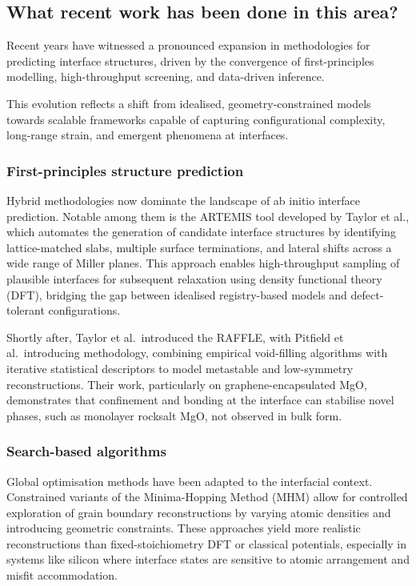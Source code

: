 \subsection{What recent work has been done in this area?}

Recent years have witnessed a pronounced expansion in methodologies for predicting interface structures, driven by the convergence of first-principles modelling, high-throughput screening, and data-driven inference.

This evolution reflects a shift from idealised, geometry-constrained models towards scalable frameworks capable of capturing configurational complexity, long-range strain, and emergent phenomena at interfaces.

\subsubsection{First-principles structure prediction}

Hybrid methodologies now dominate the landscape of ab initio interface prediction. Notable among them is the \textsc{ARTEMIS} tool developed by Taylor et al., which automates the generation of candidate interface structures by identifying lattice-matched slabs, multiple surface terminations, and lateral shifts across a wide range of Miller planes. This approach enables high-throughput sampling of plausible interfaces for subsequent relaxation using density functional theory (DFT), bridging the gap between idealised registry-based models and defect-tolerant configurations.

Shortly after, Taylor et al.\ introduced the \textsc{RAFFLE}, with Pitfield et al.\ introducing methodology, combining empirical void-filling algorithms with iterative statistical descriptors to model metastable and low-symmetry reconstructions. Their work, particularly on graphene-encapsulated MgO, demonstrates that confinement and bonding at the interface can stabilise novel phases, such as monolayer rocksalt MgO, not observed in bulk form.

\subsubsection{Search-based algorithms}

Global optimisation methods have been adapted to the interfacial context. Constrained variants of the Minima-Hopping Method (MHM) allow for controlled exploration of grain boundary reconstructions by varying atomic densities and introducing geometric constraints. These approaches yield more realistic reconstructions than fixed-stoichiometry DFT or classical potentials, especially in systems like silicon where interface states are sensitive to atomic arrangement and misfit accommodation.


